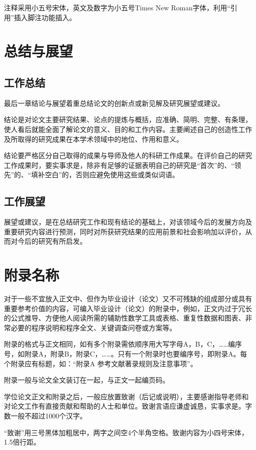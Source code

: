 \documentclass[fandol]{seuthesis-2022}
\begin{document}
注释采用小五号宋体，英文及数字为小五号Times New Roman字体，利用“引用”插入脚注功能插入。

\chapter{总结与展望}
\section{工作总结}
最后一章结论与展望着重总结论文的创新点或新见解及研究展望或建议。

结论是对论文主要研究结果、论点的提炼与概括，应准确、简明、完整、有条理，使人看后就能全面了解论文的意义、目的和工作内容。主要阐述自己的创造性工作及所取得的研究成果在本学术领域中的地位、作用和意义。

结论要严格区分自己取得的成果与导师及他人的科研工作成果。在评价自己的研究工作成果时，要实事求是，除非有足够的证据表明自己的研究是“首次”的、“领先”的、“填补空白”的，否则应避免使用这些或类似词语。

\section{工作展望}
展望或建议，是在总结研究工作和现有结论的基础上，对该领域今后的发展方向及重要研究内容进行预测，同时对所获研究结果的应用前景和社会影响加以评价，从而对今后的研究有所启发。

\nocite{*}



\appendix
\chapter{附录名称}
对于一些不宜放入正文中、但作为毕业设计（论文）又不可残缺的组成部分或具有重要参考价值的内容，可编入毕业设计（论文）的附录中，例如，正文内过于冗长的公式推导、方便他人阅读所需的辅助性数学工具或表格、重复性数据和图表、非常必要的程序说明和程序全文、关键调查问卷或方案等。

附录的格式与正文相同，如有多个附录需依顺序用大写字母A，B，C，……编序号，如附录A，附录B，附录C，……。只有一个附录时也要编序号，即附录A。每个附录应有标题，如：“附录A 参考文献著录规则及注意事项”。

附录一般与论文全文装订在一起，与正文一起编页码。


\begin{acknowledgement}
学位论文正文和附录之后，一般应放置致谢（后记或说明），主要感谢指导老师和对论文工作有直接贡献和帮助的人士和单位。致谢言语应谦虚诚恳，实事求是。字数一般不超过1000个汉字。

“致谢”用三号黑体加粗居中，两字之间空4个半角空格。致谢内容为小四号宋体，1.5倍行距。
\end{acknowledgement}
\end{document}
